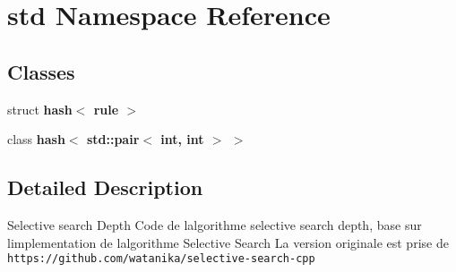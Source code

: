\section{std Namespace Reference}
\label{namespacestd}
\subsection*{Classes}
\begin{DoxyCompactItemize}
\item 
struct \textbf{ hash$<$ rule $>$}
\item 
class \textbf{ hash$<$ std\+::pair$<$ int, int $>$ $>$}
\end{DoxyCompactItemize}


\subsection{Detailed Description}
Selective search Depth Code de l\textquotesingle{}algorithme selective search depth, base sur l\textquotesingle{}implementation de l\textquotesingle{}algorithme Selective Search La version originale est prise de {\tt https\+://github.\+com/watanika/selective-\/search-\/cpp} 
